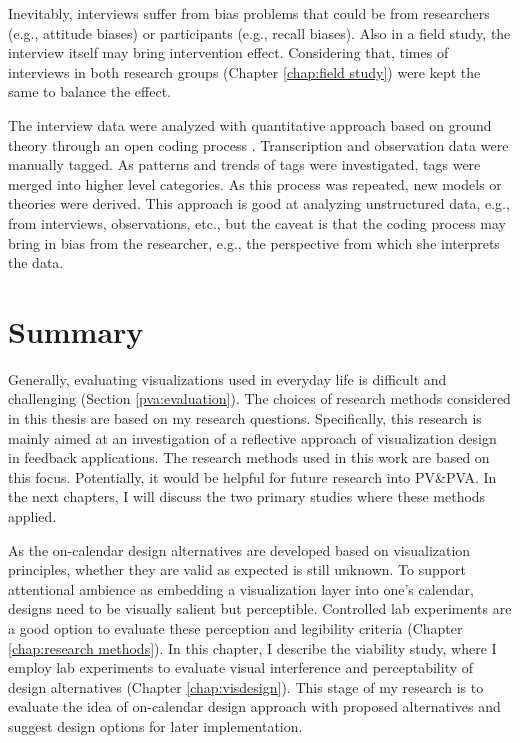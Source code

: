 \documentclass[12pt,oneside]{book}
\begin{document}
Inevitably, interviews suffer from bias problems that could be from researchers (e.g., attitude biases) or participants (e.g., recall biases).  Also in a field study, the interview itself may bring intervention effect. Considering that, times of interviews in both research groups (Chapter \ref{chap:field study}) were kept the same to balance the effect.

The interview data were analyzed with quantitative approach based on ground theory through an open coding process \cite{_beliv_2008}. Transcription and observation data were manually tagged.  As patterns and trends of tags were investigated, tags were merged into higher level categories.  As this process was repeated, new models or theories were derived.  This approach is good at analyzing unstructured data, e.g., from interviews, observations, etc., but the caveat is that the coding process may bring in bias from the researcher, e.g., the perspective from which she interprets the data.

\section{Summary}
Generally, evaluating visualizations used in everyday life is difficult and challenging (Section \ref{pva:evaluation}).  The choices of research methods considered in this thesis are based on my research questions.  Specifically, this research is mainly aimed at an investigation of a reflective approach of visualization design in feedback applications. The research methods used in this work are based on this focus.  Potentially, it would be helpful for future research into PV\&PVA.  In the next chapters, I will discuss the two primary studies where these methods applied.




\label{chap:viability study}

As the on-calendar design alternatives are developed based on visualization principles, whether they are valid as expected is still unknown.  To support attentional ambience as embedding a visualization layer into one's calendar, designs need to be visually salient but perceptible.  Controlled lab experiments are a good option to evaluate these perception and legibility criteria (Chapter \ref{chap:research methods}).  In this chapter, I describe the viability study, where I employ lab experiments to evaluate visual interference and perceptability of design alternatives (Chapter \ref{chap:visdesign}).  This stage of my research is to evaluate the idea of on-calendar design approach with proposed alternatives and suggest design options for later implementation.
\end{document}
